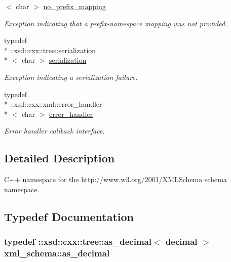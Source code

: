 \begin{DoxyCompactItemize}
$<$ char $>$ \hyperlink{namespacexml__schema_a103914036487a85ba84743f0e65b1d96}{no\-\_\-prefix\-\_\-mapping}
\begin{DoxyCompactList}\small\item\em Exception indicating that a prefix-\/namespace mapping was not provided. \end{DoxyCompactList}\item 
typedef \\*
\-::xsd\-::cxx\-::tree\-::serialization\\*
$<$ char $>$ \hyperlink{namespacexml__schema_a40e04a11c9e6204762591b4de3755899}{serialization}
\begin{DoxyCompactList}\small\item\em Exception indicating a serialization failure. \end{DoxyCompactList}\item 
typedef \\*
\-::xsd\-::cxx\-::xml\-::error\-\_\-handler\\*
$<$ char $>$ \hyperlink{namespacexml__schema_a0a5d9528e9175cedf199984a8bb64d62}{error\-\_\-handler}
\begin{DoxyCompactList}\small\item\em Error handler callback interface. \end{DoxyCompactList}\end{DoxyCompactItemize}


\subsection{Detailed Description}
C++ namespace for the http\-://www.w3.\-org/2001/\-X\-M\-L\-Schema schema namespace. 

\subsection{Typedef Documentation}
\hypertarget{namespacexml__schema_a60dfdca63dedf12d8a524c0496def693}{
\subsubsection[{as\-\_\-decimal}]{\setlength{\rightskip}{0pt plus 5cm}typedef \-::xsd\-::cxx\-::tree\-::as\-\_\-decimal$<$ {\bf decimal} $>$ {\bf xml\-\_\-schema\-::as\-\_\-decimal}}}\label{namespacexml__schema_a60dfdca63dedf12d8a524c0496def693}


